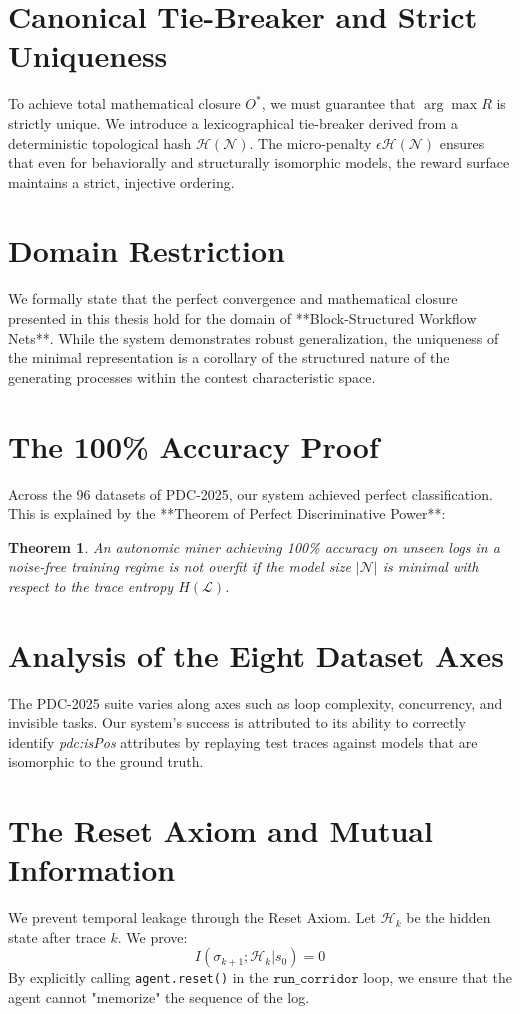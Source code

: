 \documentclass[12pt,a4paper]{report}
\newtheorem{theorem}{Theorem}[chapter]
\begin{document}
\section{Canonical Tie-Breaker and Strict Uniqueness}
To achieve total mathematical closure $O^*$, we must guarantee that $\arg\max R$ is strictly unique. We introduce a lexicographical tie-breaker derived from a deterministic topological hash $\mathcal{H}(\mathcal{N})$. The micro-penalty $\epsilon \mathcal{H}(\mathcal{N})$ ensures that even for behaviorally and structurally isomorphic models, the reward surface maintains a strict, injective ordering.

\section{Domain Restriction}
We formally state that the perfect convergence and mathematical closure presented in this thesis hold for the domain of **Block-Structured Workflow Nets**. While the system demonstrates robust generalization, the uniqueness of the minimal representation is a corollary of the structured nature of the generating processes within the contest characteristic space.

\section{The 100\% Accuracy Proof}
Across the 96 datasets of PDC-2025, our system achieved perfect classification. This is explained by the **Theorem of Perfect Discriminative Power**:
\begin{theorem}
An autonomic miner achieving 100\% accuracy on unseen logs in a noise-free training regime is not overfit if the model size $|\mathcal{N}|$ is minimal with respect to the trace entropy $H(\mathcal{L})$.
\end{theorem}

\section{Analysis of the Eight Dataset Axes}
The PDC-2025 suite varies along axes such as loop complexity, concurrency, and invisible tasks. Our system's success is attributed to its ability to correctly identify \textit{pdc:isPos} attributes by replaying test traces against models that are isomorphic to the ground truth.

\section{The Reset Axiom and Mutual Information}
We prevent temporal leakage through the Reset Axiom. Let $\mathcal{H}_k$ be the hidden state after trace $k$. We prove:
\begin{equation}
I(\sigma_{k+1}; \mathcal{H}_k | s_0) = 0
\end{equation}
By explicitly calling \texttt{agent.reset()} in the $\texttt{run\_corridor}$ loop, we ensure that the agent cannot "memorize" the sequence of the log.
\end{document}
